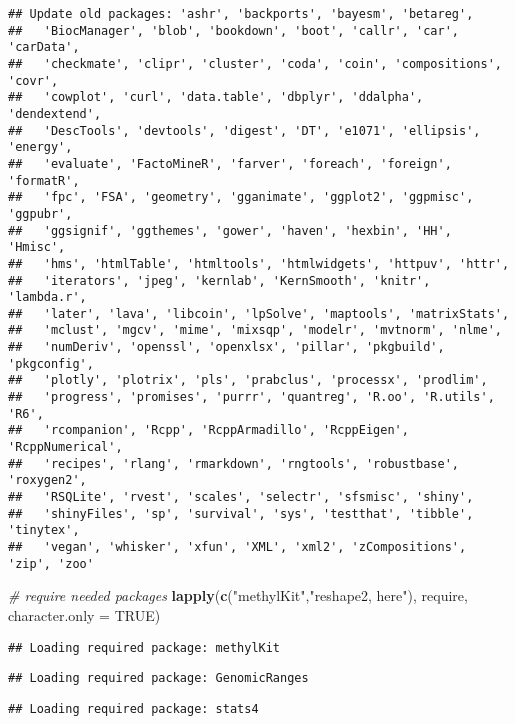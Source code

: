 \documentclass[]{article}
\newenvironment{Shaded}{\begin{snugshade}}{\end{snugshade}}
\newcommand{\KeywordTok}[1]{\textcolor[rgb]{0.13,0.29,0.53}{\textbf{#1}}}
\newcommand{\DataTypeTok}[1]{\textcolor[rgb]{0.13,0.29,0.53}{#1}}
\newcommand{\StringTok}[1]{\textcolor[rgb]{0.31,0.60,0.02}{#1}}
\newcommand{\CommentTok}[1]{\textcolor[rgb]{0.56,0.35,0.01}{\textit{#1}}}
\newcommand{\OtherTok}[1]{\textcolor[rgb]{0.56,0.35,0.01}{#1}}
\newcommand{\NormalTok}[1]{#1}
\begin{document}
\begin{verbatim}
## Update old packages: 'ashr', 'backports', 'bayesm', 'betareg',
##   'BiocManager', 'blob', 'bookdown', 'boot', 'callr', 'car', 'carData',
##   'checkmate', 'clipr', 'cluster', 'coda', 'coin', 'compositions', 'covr',
##   'cowplot', 'curl', 'data.table', 'dbplyr', 'ddalpha', 'dendextend',
##   'DescTools', 'devtools', 'digest', 'DT', 'e1071', 'ellipsis', 'energy',
##   'evaluate', 'FactoMineR', 'farver', 'foreach', 'foreign', 'formatR',
##   'fpc', 'FSA', 'geometry', 'gganimate', 'ggplot2', 'ggpmisc', 'ggpubr',
##   'ggsignif', 'ggthemes', 'gower', 'haven', 'hexbin', 'HH', 'Hmisc',
##   'hms', 'htmlTable', 'htmltools', 'htmlwidgets', 'httpuv', 'httr',
##   'iterators', 'jpeg', 'kernlab', 'KernSmooth', 'knitr', 'lambda.r',
##   'later', 'lava', 'libcoin', 'lpSolve', 'maptools', 'matrixStats',
##   'mclust', 'mgcv', 'mime', 'mixsqp', 'modelr', 'mvtnorm', 'nlme',
##   'numDeriv', 'openssl', 'openxlsx', 'pillar', 'pkgbuild', 'pkgconfig',
##   'plotly', 'plotrix', 'pls', 'prabclus', 'processx', 'prodlim',
##   'progress', 'promises', 'purrr', 'quantreg', 'R.oo', 'R.utils', 'R6',
##   'rcompanion', 'Rcpp', 'RcppArmadillo', 'RcppEigen', 'RcppNumerical',
##   'recipes', 'rlang', 'rmarkdown', 'rngtools', 'robustbase', 'roxygen2',
##   'RSQLite', 'rvest', 'scales', 'selectr', 'sfsmisc', 'shiny',
##   'shinyFiles', 'sp', 'survival', 'sys', 'testthat', 'tibble', 'tinytex',
##   'vegan', 'whisker', 'xfun', 'XML', 'xml2', 'zCompositions', 'zip', 'zoo'
\end{verbatim}

\begin{Shaded}
\begin{Highlighting}[]
\CommentTok{# require needed packages }
\KeywordTok{lapply}\NormalTok{(}\KeywordTok{c}\NormalTok{(}\StringTok{"methylKit"}\NormalTok{,}\StringTok{"reshape2, here"}\NormalTok{), require, }\DataTypeTok{character.only =} \OtherTok{TRUE}\NormalTok{)}
\end{Highlighting}
\end{Shaded}

\begin{verbatim}
## Loading required package: methylKit
\end{verbatim}

\begin{verbatim}
## Loading required package: GenomicRanges
\end{verbatim}

\begin{verbatim}
## Loading required package: stats4
\end{verbatim}
\end{document}
